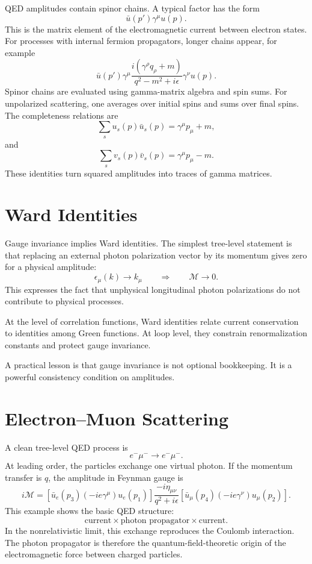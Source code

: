 QED amplitudes contain spinor chains. A typical factor has the form
\[
    \bar u(p')\gamma^\mu u(p).
\]
This is the matrix element of the electromagnetic current between electron
states. For processes with internal fermion propagators, longer chains appear,
for example
\[
    \bar u(p')\gamma^\mu
    \frac{i(\gamma^\rho q_\rho+m)}{q^2-m^2+i\epsilon}
    \gamma^\nu u(p).
\]
Spinor chains are evaluated using gamma-matrix algebra and spin sums. For
unpolarized scattering, one averages over initial spins and sums over final
spins. The completeness relations are
\[
    \sum_s u_s(p)\bar u_s(p)=\gamma^\mu p_\mu+m,
\]
and
\[
    \sum_s v_s(p)\bar v_s(p)=\gamma^\mu p_\mu-m.
\]
These identities turn squared amplitudes into traces of gamma matrices.

\section{Ward Identities}

Gauge invariance implies Ward identities. The simplest tree-level statement is
that replacing an external photon polarization vector by its momentum gives zero
for a physical amplitude:
\[
    \epsilon_\mu(k)\longrightarrow k_\mu
    \qquad\Longrightarrow\qquad
    \mathcal{M}\longrightarrow0.
\]
This expresses the fact that unphysical longitudinal photon polarizations do not
contribute to physical processes.

At the level of correlation functions, Ward identities relate current
conservation to identities among Green functions. At loop level, they constrain
renormalization constants and protect gauge invariance.

A practical lesson is that gauge invariance is not optional bookkeeping. It is a
powerful consistency condition on amplitudes.

\section{Electron--Muon Scattering}

A clean tree-level QED process is
\[
    e^-\mu^-\longrightarrow e^-\mu^-.
\]
At leading order, the particles exchange one virtual photon. If the momentum
transfer is \(q\), the amplitude in Feynman gauge is
\[
    i\mathcal{M}
    = [\bar u_e(p_3)(-ie\gamma^\mu)u_e(p_1)]
      \frac{-i\eta_{\mu\nu}}{q^2+i\epsilon}
      [\bar u_\mu(p_4)(-ie\gamma^\nu)u_\mu(p_2)].
\]
This example shows the basic QED structure:
\[
    \text{current}\times\text{photon propagator}\times\text{current}.
\]
In the nonrelativistic limit, this exchange reproduces the Coulomb interaction.
The photon propagator is therefore the quantum-field-theoretic origin of the
electromagnetic force between charged particles.

